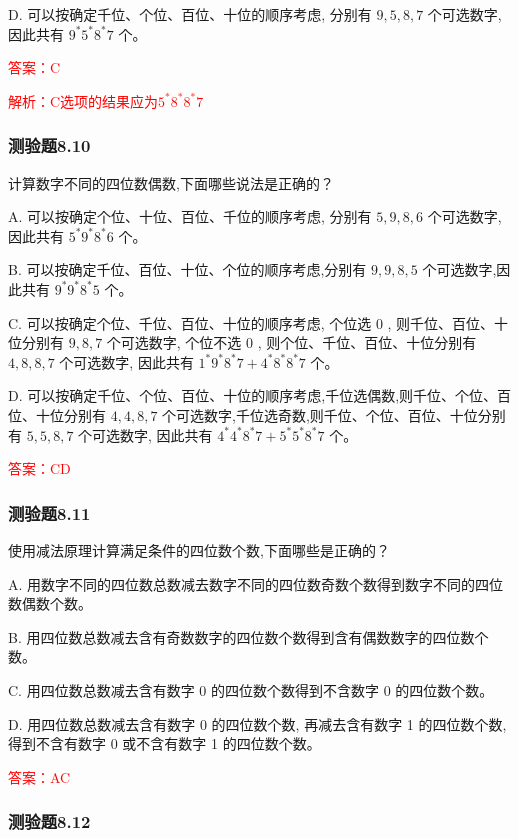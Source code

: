 \documentclass[UTF8, heading=true]{ctexart}
\begin{document}
D. 可以按确定千位、个位、百位、十位的顺序考虑, 分别有 $9,5,8,7$ 个可选数字, 因此共有 $9 ^* 5^* 8^* 7$ 个。

\textcolor{red}{答案：C}

\textcolor{red}{解析：C选项的结果应为$5^* 8 ^* 8 ^* 7$}

\subsubsection{测验题8.10}

计算数字不同的四位数偶数,下面哪些说法是正确的？

A. 可以按确定个位、十位、百位、千位的顺序考虑, 分别有 $5,9,8,6$ 个可选数字, 因此共有 $5^* 9^* 8^* 6$ 个。

B. 可以按确定千位、百位、十位、个位的顺序考虑,分别有 $9,9,8,5$ 个可选数字,因此共有 $9^* 9^* 8^* 5$ 个。

C. 可以按确定个位、千位、百位、十位的顺序考虑, 个位选 0 , 则千位、百位、十位分别有 $9,8,7$ 个可选数字, 个位不选 0 , 则个位、千位、百位、十位分别有 $4,8,8,7$ 个可选数字, 因此共有 $1 ^* 9^* 8^* 7+4^* 8^* 8^* 7$ 个。

D. 可以按确定千位、个位、百位、十位的顺序考虑,千位选偶数,则千位、个位、百位、十位分别有 $4,4,8,7$ 个可选数字,千位选奇数,则千位、个位、百位、十位分别有 $5,5,8,7$ 个可选数字, 因此共有 $4^* 4^* 8^* 7+5^* 5^* 8^* 7$ 个。

\textcolor{red}{答案：CD}

\subsubsection{测验题8.11}

使用减法原理计算满足条件的四位数个数,下面哪些是正确的？

A. 用数字不同的四位数总数减去数字不同的四位数奇数个数得到数字不同的四位数偶数个数。

B. 用四位数总数减去含有奇数数字的四位数个数得到含有偶数数字的四位数个数。

C. 用四位数总数减去含有数字 0 的四位数个数得到不含数字 0 的四位数个数。

D. 用四位数总数减去含有数字 0 的四位数个数, 再减去含有数字 1 的四位数个数, 得到不含有数字 0 或不含有数字 1 的四位数个数。

\textcolor{red}{答案：AC}

\subsubsection{测验题8.12}
\end{document}
